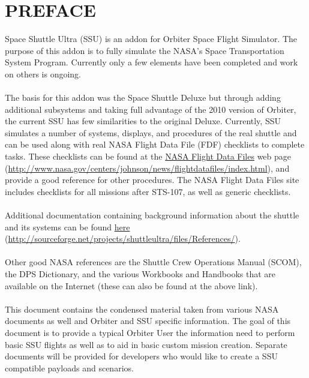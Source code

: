 \documentclass[13pt]{article}
\begin{document}
\section*{PREFACE}
\begin{multicols*}{2}
Space Shuttle Ultra (SSU) is an addon for Orbiter Space Flight Simulator.  The purpose of this addon is to fully simulate the NASA's Space Transportation System Program.  Currently only a few elements have been completed and work on others is ongoing.\\
\\
The basis for this addon was the Space Shuttle Deluxe but through adding additional subsystems and taking full advantage of the 2010 version of Orbiter, the current SSU has few similarities to the original Deluxe.  Currently, SSU simulates a number of systems, displays, and procedures of the real shuttle and can be used along with real NASA Flight Data File (FDF) checklists to complete tasks.  These checklists can be found at the \href{http://www.nasa.gov/centers/johnson/news/flightdatafiles/index.html}{NASA Flight Data Files} web page (\url{http://www.nasa.gov/centers/johnson/news/flightdatafiles/index.html}), and provide a good reference for other procedures. The NASA Flight Data Files site includes checklists for all missions after STS-107, as well as generic checklists. \\
\\
Additional documentation containing background information about the shuttle and its systems can be found \href{http://sourceforge.net/projects/shuttleultra/files/References/}{here} (\url{http://sourceforge.net/projects/shuttleultra/files/References/}).\\
\\
Other good NASA references are the Shuttle Crew Operations Manual (SCOM), the DPS Dictionary, and the various Workbooks and Handbooks that are available on the Internet (these can also be found at the above link). \\
\\
This document contains the condensed material taken from various NASA documents as well and Orbiter and SSU specific information.  The goal of this document is to provide a typical Orbiter User the information need to perform basic SSU flights as well as  to aid in basic custom mission creation.  Separate documents will be provided for developers who would like to create a SSU compatible payloads and scenarios.\\
\\

\end{multicols*}
\end{document}
